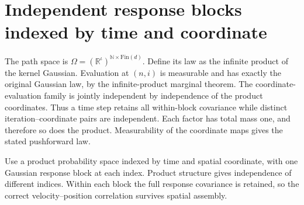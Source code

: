 \documentclass[11pt,a4paper]{article}
\begin{document}
\section{\texorpdfstring{Independent response blocks indexed by time and coordinate}{Independent response blocks indexed by time and coordinate}}


The path space is \(\Omega=(\mathbb R^{\iota})^{\mathbb N\times\mathrm{Fin}(d)}\). Define its law as the infinite product of the kernel Gaussian. Evaluation at \((n,i)\) is measurable and has exactly the original Gaussian law, by the infinite-product marginal theorem. The coordinate-evaluation family is jointly independent by independence of the product coordinates. Thus a time step retains all within-block covariance while distinct iteration–coordinate pairs are independent. Each factor has total mass one, and therefore so does the product. Measurability of the coordinate maps gives the stated pushforward law.



Use a product probability space indexed by time and spatial coordinate, with one Gaussian response block at each index. Product structure gives independence of different indices. Within each block the full response covariance is retained, so the correct velocity–position correlation survives spatial assembly.
\end{document}
